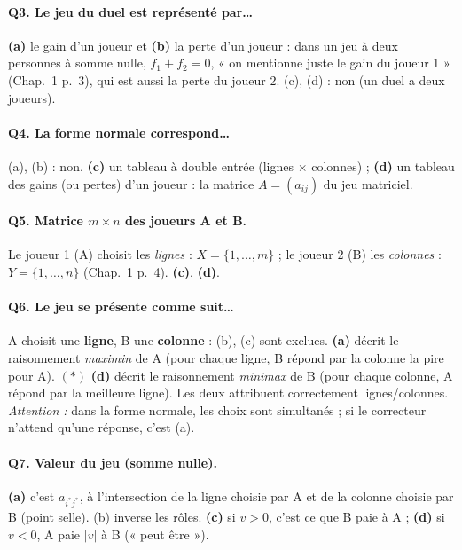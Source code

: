 \documentclass[11pt,a4paper]{article}
\newcommand{\bon}[1]{\textcolor{green!50!black}{\textbf{#1}}}
\newcommand{\faux}[1]{\textcolor{red!70!black}{#1}}
\begin{document}
\paragraph{Q3. Le jeu du duel est représenté par\dots}
\bon{(a)} le gain d'un joueur et \bon{(b)} la perte d'un joueur : dans un jeu à deux personnes à somme nulle, $f_1+f_2=0$, « on mentionne juste le gain du joueur 1 » (Chap.~1 p.~3), qui est aussi la perte du joueur 2. \faux{(c)}, \faux{(d)} : non (un duel a deux joueurs).

\paragraph{Q4. La forme normale correspond\dots}
\faux{(a)}, \faux{(b)} : non. \bon{(c)} un tableau à double entrée (lignes $\times$ colonnes) ; \bon{(d)} un tableau des gains (ou pertes) d'un joueur : la matrice $A=(a_{ij})$ du jeu matriciel.

\paragraph{Q5. Matrice $m\times n$ des joueurs A et B.}
Le joueur 1 (A) choisit les \emph{lignes} : $X=\{1,\dots,m\}$ ; le joueur 2 (B) les \emph{colonnes} : $Y=\{1,\dots,n\}$ (Chap.~1 p.~4). \bon{(c)}, \bon{(d)}.

\paragraph{Q6. Le jeu se présente comme suit\dots}
A choisit une \textbf{ligne}, B une \textbf{colonne} : \faux{(b)}, \faux{(c)} sont exclues. \bon{(a)} décrit le raisonnement \emph{maximin} de A (pour chaque ligne, B répond par la colonne la pire pour A). $(\ast)$ \bon{(d)} décrit le raisonnement \emph{minimax} de B (pour chaque colonne, A répond par la meilleure ligne). Les deux attribuent correctement lignes/colonnes. \emph{Attention :} dans la forme normale, les choix sont simultanés ; si le correcteur n'attend qu'une réponse, c'est (a).

\paragraph{Q7. Valeur du jeu (somme nulle).}
\bon{(a)} c'est $a_{i^*j^*}$, à l'intersection de la ligne choisie par A et de la colonne choisie par B (point selle). \faux{(b)} inverse les rôles. \bon{(c)} si $v>0$, c'est ce que B paie à A ; \bon{(d)} si $v<0$, A paie $|v|$ à B (« peut être »).
\end{document}
